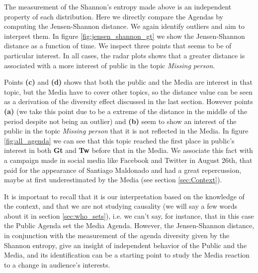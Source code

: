 \par The measurement of the Shannon's entropy made above is an independent property of each distribution. 
Here we directly compare the Agendas by computing the Jensen-Shannon distance. We again identify outliers and aim to interpret them.
In figure \ref{fig:jensen_shannon_gt} we show the Jensen-Shannon distance as a function of time. We inspect three points that seems to be of particular interest. In all cases, the radar plots shows that a greater distance is associated with a more interest of public in the topic \emph{Missing person}. 
\par Points \textbf{(c)} and \textbf{(d)} shows that both the public and the Media are interest in that topic, but the Media have to cover other topics, so the distance value can be seen as a derivation of the diversity effect discussed in the last section.
However points \textbf{(a)} (we take this point due to be a extreme of the distance in the middle of the period despite not being an outlier) and \textbf{(b)} seem to show an interest of the public in the topic \emph{Missing person} that it is not reflected in the Media. In figure \ref{fig:all_agenda} we can see that this topic reached the first place in public's interest in both \textbf{Gt} and \textbf{Tw} before that in the Media. We associate this fact with a campaign made in social media like Facebook and Twitter in August 26th, that paid for the appearance of Santiago Maldonado and had a great repercussion, maybe at first underestimated by the Media (see section \ref{sec:Context}). 
\par It is important to recall that it is our interpretation based on the knowledge of the context, and that we are not studying causality (we will say a few words about it in section \ref{sec:who_sets}), i.e. we can't say, for instance, that in this case the Public Agenda set the Media Agenda. 
However, the Jensen-Shannon distance, in conjunction with the measurement of the agenda diversity given by the Shannon entropy, give an insight of independent behavior of the Public and the Media, and its identification can be a starting point to study the Media reaction to a change in audience's interests.
 
